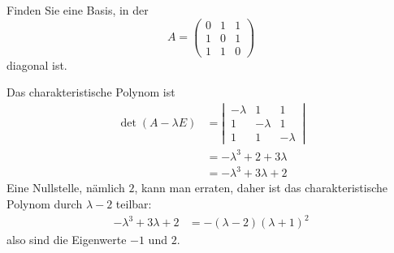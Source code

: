Finden Sie eine Basis, in der
\[
A=\begin{pmatrix}
0&1&1\\
1&0&1\\
1&1&0
\end{pmatrix}
\]
diagonal ist.


\begin{loesung}
Das charakteristische Polynom ist
\begin{align*}
\det(A-\lambda E)
&=
\left|\,
\begin{matrix}
-\lambda&1&1\\
1&-\lambda&1\\
1&1&-\lambda
\end{matrix}
\,\right|
\\
&=-\lambda^3+2+3\lambda
\\
&=-\lambda^3+3\lambda+2
\end{align*}
Eine Nullstelle, nämlich $2$, kann man erraten, daher ist das
charakteristische Polynom durch $\lambda-2$ teilbar:
\begin{align*}
-\lambda^3+3\lambda+2
&=-(\lambda-2)(\lambda+1)^2
\end{align*}
also sind die Eigenwerte $-1$ und $2$.


\end{loesung}
